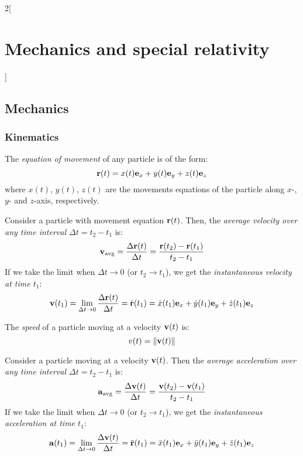 \documentclass[../../../main.tex]{subfiles}
\begin{document}
\begin{multicols}{2}[\section{Mechanics and special relativity}]
    \subsection{Mechanics}
    \subsubsection*{Kinematics}
    \begin{definition}
        The \textit{equation of movement} of any particle is of the form:
        $$\boldsymbol{\mathrm{r}}(t)=x(t)\boldsymbol{\mathrm{e}}_x+y(t)\boldsymbol{\mathrm{e}}_y+z(t)\boldsymbol{\mathrm{e}}_z$$ where $x(t)$, $y(t)$, $z(t)$ are the movements equations of the particle along $x$-, $y$- and $z$-axis, respectively.
    \end{definition}
    \begin{definition}
        Consider a particle with movement equation $\boldsymbol{\mathrm{r}}(t)$. Then, the \textit{average velocity over any time interval $\Delta t=t_2-t_1$} is:
        $$\boldsymbol{\mathrm{v}}_\text{avg}=\frac{\Delta\boldsymbol{\mathrm{r}}(t)}{\Delta t}=\frac{\boldsymbol{\mathrm{r}}(t_2)-\boldsymbol{\mathrm{r}}(t_1)}{t_2-t_1}$$
        If we take the limit when $\Delta t\to0$ (or $t_2\to t_1$), we get the \textit{instantaneous velocity at time $t_1$}: $$\boldsymbol{\mathrm{v}}(t_1)=\lim_{\Delta t\to 0}\frac{\Delta\boldsymbol{\mathrm{r}}(t)}{\Delta t}=\dot{\boldsymbol{\mathrm{r}}}(t_1)=\dot{x}(t_1)\boldsymbol{\mathrm{e}}_x+\dot{y}(t_1)\boldsymbol{\mathrm{e}}_y+\dot{z}(t_1)\boldsymbol{\mathrm{e}}_z$$
    \end{definition}
    \begin{definition}
        The \textit{speed} of a particle moving at a velocity $\boldsymbol{\mathrm{v}}(t)$ is:
        $$v(t)=\|\boldsymbol{\mathrm{v}}(t)\|$$
    \end{definition}
    \begin{definition}
        Consider a particle moving at a velocity $\boldsymbol{\mathrm{v}}(t)$. Then the \textit{average acceleration over any time interval $\Delta t=t_2-t_1$} is:
        $$\boldsymbol{\mathrm{a}}_\text{avg}=\frac{\Delta\boldsymbol{\mathrm{v}}(t)}{\Delta t}=\frac{\boldsymbol{\mathrm{v}}(t_2)-\boldsymbol{\mathrm{v}}(t_1)}{t_2-t_1}$$
        If we take the limit when $\Delta t\to0$ (or $t_2\to t_1$), we get the \textit{instantaneous acceleration at time $t_1$}: $$\boldsymbol{\mathrm{a}}(t_1)=\lim_{\Delta t\to 0}\frac{\Delta\boldsymbol{\mathrm{v}}(t)}{\Delta t}=\ddot{\boldsymbol{\mathrm{r}}}(t_1)=\ddot{x}(t_1)\boldsymbol{\mathrm{e}}_x+\ddot{y}(t_1)\boldsymbol{\mathrm{e}}_y+\ddot{z}(t_1)\boldsymbol{\mathrm{e}}_z$$

\end{definition}
\end{multicols}
\end{document}
